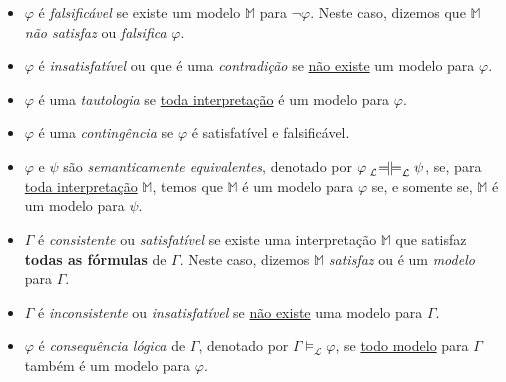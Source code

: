 \begin{itemize}[left=0.5cm, align=left, nosep]
            \textbf{Observação.} Usaremos o símbolo $\mathcal{L}$ para nos referirmos a uma linguagem lógica qualquer. 
            Denotamos por $\text{FBF}_{\mathcal{L}}$ o conjunto de fórmulas bem-formadas da linguagem lógica $\mathcal{L}$.

            Considere $\varphi, \psi \in \text{FBF}_{\mathcal{L}}$ e $\Gamma \subseteq \text{FBF}_{\mathcal{L}}$ para as seguintes 
            definições:

            \item $\varphi$ é \textit{falsificável} se existe um modelo $\mathbb{M}$ para $\neg \varphi$. Neste caso, 
            dizemos que $\mathbb{M}$ \textit{não satisfaz} ou \textit{falsifica} $\varphi$.

            \item $\varphi$ é \textit{insatisfatível} ou que é uma \textit{contradição} se \underline{não existe} um modelo 
            para $\varphi$.

            \item $\varphi$ é uma \textit{tautologia} se \underline{toda interpretação} é um modelo para $\varphi$.

            \item $\varphi$ é uma \textit{contingência} se $\varphi$ é satisfatível e falsificável.

            \item $\varphi$ e $\psi$ são \textit{semanticamente equivalentes}, denotado por $\varphi \Lbimodels \psi$, se, 
            para \underline{toda interpretação} $\mathbb{M}$, temos que $\mathbb{M}$ é um modelo para $\varphi$ se, e somente se, 
            $\mathbb{M}$ é um modelo para $\psi$.

            \item $\Gamma$ é \textit{consistente} ou \textit{satisfatível} se existe uma interpretação $\mathbb{M}$ que satisfaz 
            \textbf{todas as fórmulas} de $\Gamma$. Neste caso, dizemos $\mathbb{M}$ \textit{satisfaz} ou é um \textit{modelo} 
            para $\Gamma$.

            \item $\Gamma$ é \textit{inconsistente} ou \textit{insatisfatível} se \underline{não existe} uma modelo para $\Gamma$. 
        
            \item $\varphi$ é \textit{consequência lógica} de $\Gamma$, denotado por $\Gamma \models_{\mathcal{L}} \varphi$, se 
            \underline{todo modelo} para $\Gamma$ também é um modelo para $\varphi$.


\end{itemize}
